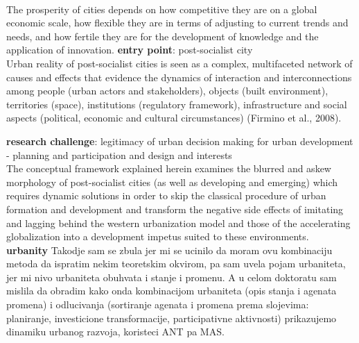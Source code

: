 \documentclass[11pt]{report}
\begin{document}
\\
The prosperity of cities depends on how competitive they are on a global economic scale, how flexible they are in terms of adjusting to current trends and needs, and how fertile they are for the development of knowledge and the application of innovation.
\textbf{entry point}: post-socialist city
\\
Urban reality of post-socialist cities is seen as a complex, multifaceted network of causes and effects that evidence  the dynamics of  interaction  and  interconnections  among  people  (urban  actors  and  stakeholders),  objects  (built  environment), territories (space), institutions (regulatory framework), infrastructure and social  aspects (political, economic and cultural circumstances) (Firmino et al., 2008).

\textbf{research challenge}: legitimacy of urban decision making for urban development - planning and participation and design and interests
\\
The  conceptual  framework  explained  herein  examines  the  blurred  and  askew  morphology of  post-socialist  cities (as well as developing and emerging) which  requires  dynamic  solutions  in  order  to  skip  the  classical  procedure  of  urban  formation  and 
development and transform the negative side effects of imitating and lagging behind the western urbanization model and those of the accelerating globalization into a development impetus suited to these environments.
\\
\textbf{urbanity}
Takodje sam se zbula jer mi se ucinilo da moram ovu kombinaciju metoda da ispratim nekim teoretskim okvirom, pa sam uvela pojam urbaniteta, jer mi nivo urbaniteta obuhvata i stanje i promenu. A u celom doktoratu sam mislila da obradim kako onda kombinacijom urbaniteta (opis stanja i agenata promena) i odlucivanja (sortiranje agenata i promena prema slojevima: planiranje, investicione transformacije, participativne aktivnosti) prikazujemo dinamiku urbanog razvoja, koristeci  ANT pa MAS. 
\end{document}
